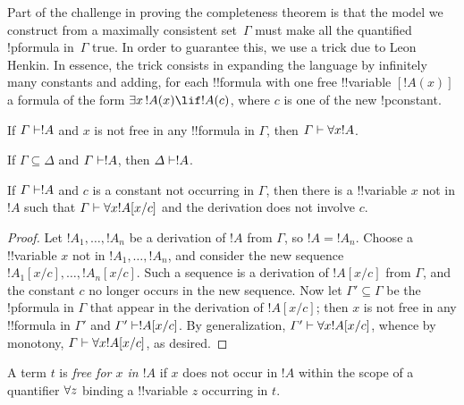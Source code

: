 \documentclass[../../include/open-logic-section]{subfiles}
\begin{document}

\begin{explain}
Part of the challenge in proving the completeness theorem is that the
model we construct from a maximally consistent set~$\Gamma$ must make
all the quantified !p{formula} in~$\Gamma$ true.  In order to guarantee
this, we use a trick due to Leon Henkin.  In essence, the trick
consists in expanding the language by infinitely many constants and
adding, for each !!{formula} with one free !!{variable} $[!A(x)]$ a formula of
the form $\lexists[x][!A(x)] \lif !A(c)$, where $c$ is one of the new
!p{constant}.  
\end{explain}

\begin{prop}[Generalization]
If $\Gamma \Proves !A$ and $x$ is not free in any !!{formula} in $\Gamma$, 
then $\Gamma \Proves \lforall[x] !A$.
\end{prop}

\begin{prop}[Monotony]
If $\Gamma \subseteq \Delta$ and $\Gamma \Proves !A$, then $\Delta \Proves !A$.
\end{prop}

\begin{thm}
If $\Gamma \Proves !A$ and $c$ is a constant not occurring in
$\Gamma$, then there is a !!{variable} $x$ not in $!A$ such that $\Gamma
\Proves \lforall[x] !A [x/c]$ and the derivation does not involve $c$.
\end{thm}

\begin{proof}
Let $!A_1, \dots, !A_n$ be a derivation of $!A$ from $\Gamma$, so $!A
= !A_n$.  Choose a !!{variable} $x$ not in $!A_1, \dots, !A_n$, and
consider the new sequence $!A_1[x/c], \dots, !A_n [x/c]$. Such a
sequence is a derivation of $!A[x/c]$ from $\Gamma$, and the constant
$c$ no longer occurs in the new sequence.
Now let $\Gamma' \subseteq \Gamma$ be the !p{formula} in $\Gamma$ that
appear in the derivation of $!A [x/c]$; then $x$ is not free in any
!!{formula} in $\Gamma'$ and $\Gamma' \Proves !A [x/c]$. By
generalization, $\Gamma' \Proves \lforall[x] !A[x/c]$, whence by
monotony, $\Gamma \Proves \lforall[x] !A [x/c]$, as desired.
\end{proof}

\begin{defn} 
A term $t$ is \emph{free for $x$ in $!A$} if $x$ does not occur in
$!A$ within the scope of a quantifier $\lforall[z]$ binding a !!{variable}
$z$ occurring in $t$.
\end{defn}
\end{document}
